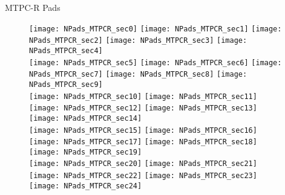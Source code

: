\documentclass[11pt]{beamer}
\begin{document}
\begin{frame}{MTPC-R Pads}
\begin{figure}
\texttt{[image: NPads\_MTPCR\_sec0]}
\texttt{[image: NPads\_MTPCR\_sec1]}
\texttt{[image: NPads\_MTPCR\_sec2]}
\texttt{[image: NPads\_MTPCR\_sec3]}
\texttt{[image: NPads\_MTPCR\_sec4]}\\
\texttt{[image: NPads\_MTPCR\_sec5]}
\texttt{[image: NPads\_MTPCR\_sec6]}
\texttt{[image: NPads\_MTPCR\_sec7]}
\texttt{[image: NPads\_MTPCR\_sec8]}
\texttt{[image: NPads\_MTPCR\_sec9]}\\
\texttt{[image: NPads\_MTPCR\_sec10]}
\texttt{[image: NPads\_MTPCR\_sec11]}
\texttt{[image: NPads\_MTPCR\_sec12]}
\texttt{[image: NPads\_MTPCR\_sec13]}
\texttt{[image: NPads\_MTPCR\_sec14]}\\
\texttt{[image: NPads\_MTPCR\_sec15]}
\texttt{[image: NPads\_MTPCR\_sec16]}
\texttt{[image: NPads\_MTPCR\_sec17]}
\texttt{[image: NPads\_MTPCR\_sec18]}
\texttt{[image: NPads\_MTPCR\_sec19]}\\
\texttt{[image: NPads\_MTPCR\_sec20]}
\texttt{[image: NPads\_MTPCR\_sec21]}
\texttt{[image: NPads\_MTPCR\_sec22]}
\texttt{[image: NPads\_MTPCR\_sec23]}
\texttt{[image: NPads\_MTPCR\_sec24]}
\end{figure}
\end{frame}
\end{document}
